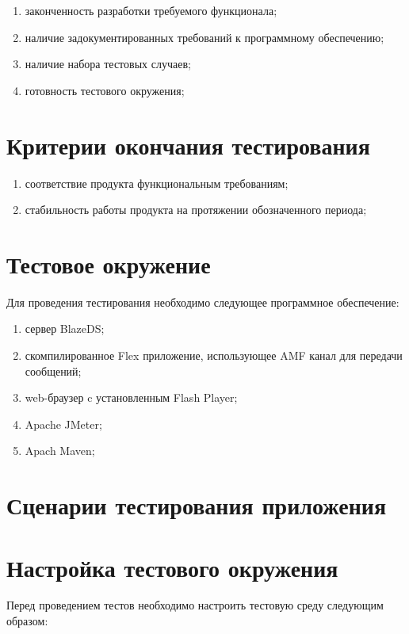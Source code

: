 \begin{enumerate}
\item законченность разработки требуемого функционала;
\item наличие задокументированных требований к программному обеспечению;
\item наличие набора тестовых случаев;
\item готовность тестового окружения;
\end{enumerate}

\section{Критерии окончания тестирования}

\begin{enumerate}
\item соответствие продукта функциональным требованиям;
\item стабильность работы продукта на протяжении обозначенного периода;
\end{enumerate}

\section{Тестовое окружение}

Для проведения тестирования необходимо следующее программное обеспечение:

\begin{enumerate}
\item сервер BlazeDS;
\item скомпилированное Flex приложение, использующее AMF канал для передачи сообщений;
\item web-браузер c установленным Flash Player;
\item Apache JMeter;
\item Apach Maven;
\end{enumerate}

\section{Сценарии тестирования приложения}

\section{Настройка тестового окружения}

Перед проведением тестов необходимо настроить тестовую среду следующим образом:

